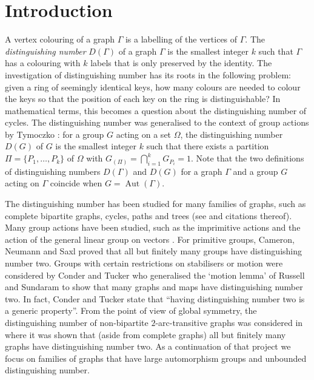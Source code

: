 \documentclass[11pt]{amsart}
\DeclareMathOperator{\Aut}{Aut}
\begin{document}
\section{Introduction}
A vertex colouring of a graph \(\Gamma\) is a labelling of the vertices of \(\Gamma\). %
The \emph{distinguishing number} \(D(\Gamma)\) of a graph \(\Gamma\) is  the smallest integer \(k\) such that \(\Gamma\) has a colouring with \(k\) labels that is only preserved by the identity.  The investigation of distinguishing number has its roots in the  following problem: given a ring of seemingly identical keys,
how many colours are needed to colour the keys so that the position of each key on the ring is distinguishable? In mathematical terms, this becomes  a question about the distinguishing number of  cycles. The distinguishing number was generalised to the context of  group actions by Tymoczko \cite{Ty}: for a   group \(G\) acting on a set \(\Omega\), the distinguishing number \(D(G)\) of \(G\) is the smallest integer \(k\) such that there exists a partition \(\Pi=\{P_{1},\ldots, P_{k}\}\) of \(\Omega\) with \(G_{(\Pi)}=\bigcap_{i=1}^{k}G_{P_{i}}=1\). Note that the two definitions of distinguishing numbers \(D(\Gamma)\) and \(D(G)\) for a graph \(\Gamma\) and a group \(G\) acting on \(\Gamma\) coincide when \(G=\Aut(\Gamma)\).

The distinguishing number has been studied for many families of graphs, such as complete bipartite graphs, cycles, paths and trees (see \cite{CT2006} and citations thereof). Many group actions have been studied, such as the imprimitive actions \cite{P2006} and the action of the general linear group on vectors \cite{klavzar}. For primitive groups, Cameron, Neumann and Saxl \cite{CNS1994} proved that all but   finitely many groups have distinguishing number two.  Groups with certain restrictions on stabilisers or motion were considered by Conder and Tucker \cite{ConderTucker} who generalised the `motion lemma' of Russell and Sundaram \cite{RussellSundaram} to show that many graphs and maps have distinguishing number two. In fact, Conder and Tucker state that ``having distinguishing number two is a generic property''. From the point of view of global symmetry, the distinguishing number of non-bipartite $2$-arc-transitive graphs was considered in \cite{DMH2018} where it was shown that (aside from complete graphs) all but finitely many graphs have distinguishing number two. As a continuation of that project we focus on families of graphs that have large automorphism groups and unbounded distinguishing number.
\end{document}

